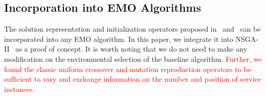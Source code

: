 




\subsection{Incorporation into EMO Algorithms}
\label{sec:incorporation}

The solution representation and initialization operators proposed in~ and~ can be incorporated into any EMO algorithm. In this paper, we integrate it into NSGA-II~\cite{DebAPM02} as a proof of concept. It is worth noting that we do not need to make any modification on the environmental selection of the baseline algorithm. \textcolor{red}{Further, we found the classic uniform crossover and mutation reproduction operators to be sufficient to vary and exchange information on the number and position of service instances.}
